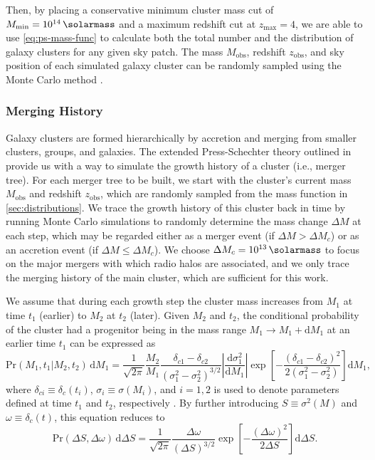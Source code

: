 \documentclass[modern]{aastex61}
\newcommand{\R}[1]{\mathrm{#1}}
\newcommand{\D}[1]{\R{d} #1}
\newcommand{\diff}[2]{\frac{\D{#1}}{\D{#2}}}
\begin{document}
Then, by placing a conservative minimum cluster mass cut of
$M_{\R{min}} = \SI{e14}{\solarmass}$ and a maximum redshift cut
at $z_{\R{max}} = 4$, we are able to use \autoref{eq:ps-mass-func}
to calculate both the total number and the distribution of galaxy
clusters for any given sky patch.
The mass $M_{\R{obs}}$, redshift $z_{\R{obs}}$, and sky position of
each simulated galaxy cluster can be randomly sampled using the
Monte Carlo method \citep{wang2010}.


\subsubsection{Merging History}
\label{sec:merging-history}

Galaxy clusters are formed hierarchically by accretion and merging from
smaller clusters, groups, and galaxies.
The extended Press-Schechter theory outlined in \citet{lacey1993} provide
us with a way to simulate the growth history of a cluster (i.e., merger tree).
For each merger tree to be built, we start with the cluster's current
mass $M_{\R{obs}}$ and redshift $z_{\R{obs}}$, which are randomly sampled
from the mass function in \autoref{sec:distributions}.
We trace the growth history of this cluster back in time by running
Monte Carlo simulations to randomly determine the mass change
$\Delta M$ at each step, which may be regarded
either as a merger event (if $\Delta M > \Delta M_c$)
or as an accretion event (if $\Delta M \leq \Delta M_c$).
We choose $\Delta M_c = \SI{e13}{\solarmass}$ to focus on the major mergers
with which radio halos are associated,
and we only trace the merging history of the main cluster,
which are sufficient for this work.

We assume that during each growth step the cluster mass increases from
$M_1$ at time $t_1$ (earlier) to $M_2$ at $t_2$ (later).
Given $M_2$ and $t_2$, the conditional probability of the cluster had
a progenitor being in the mass range $M_1 \to M_1 + \D{M_1}$ at an
earlier time $t_1$ can be expressed as
\begin{equation}
  \label{eq:eps-condprob}
  \R{Pr}(M_1, t_1 | M_2, t_2) \,\D{M_1} = \frac{1}{\sqrt{2\pi}}
\frac{M_2}{M_1}
  \frac{\delta_{c1} - \delta_{c2}}{(\sigma_1^2 - \sigma_2^2)^{3/2}}
  \left| \diff{\sigma_1^2}{M_1} \right|
  \exp \!\left[ -\frac{(\delta_{c1} - \delta_{c2})^2}
    {2(\sigma_1^2 - \sigma_2^2)} \right] \D{M_1},
\end{equation}
where
$\delta_{ci} \equiv \delta_c(t_i)$, $\sigma_i \equiv \sigma(M_i)$, and $i =
1, 2$ is used to denote parameters defined at time $t_1$ and $t_2$,
respectively \citep{lacey1993,randall2002}.
By further introducing $S \equiv \sigma^2(M)$ and
$\omega \equiv \delta_c(t)$, this equation reduces to
\begin{equation}
  \label{eq:eps-condprob-simp}
  \R{Pr}(\Delta S, \Delta \omega) \,\D{\Delta S} = \frac{1}{\sqrt{2\pi}}
  \frac{\Delta\omega}{(\Delta S)^{3/2}}
  \exp \!\left[ -\frac{(\Delta\omega)^2}{2 \Delta S} \right] \D{\Delta S}.
\end{equation}
\end{document}
